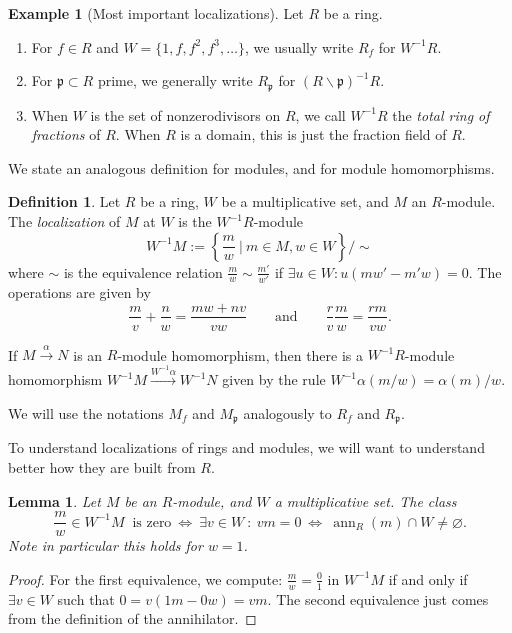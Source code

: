 \documentclass{amsart}[12pt]
\def\ann{\operatorname{ann}}
\newcommand{\p}{{\mathfrak p}}
\numberwithin{equation}{section}
\theoremstyle{plain} %
\newtheorem{lemma}[equation]{Lemma}
\theoremstyle{definition}
\newtheorem{definition}[equation]{Definition}
\newtheorem{example}[equation]{Example}
\theoremstyle{remark}
\begin{document}
\begin{example}[Most important localizations] Let $R$ be a ring.
	\begin{enumerate}
		\item For $f\in R$ and $W=\{1, f, f^2, f^3, \dots\}$, we usually write $R_f$ for $W^{-1}R$.
		\item For $\p\subset R$ prime, we generally write $R_{\p}$\index{$R_{\p}$} for $(R\smallsetminus \p)^{-1} R$.
		\item When $W$ is the set of nonzerodivisors on $R$, we call $W^{-1}R$ the \emph{total ring of fractions} of $R$. When $R$ is a domain, this is just the fraction field of $R$.
	\end{enumerate}
\end{example}

We state an analogous definition for modules, and for module homomorphisms.

\begin{definition}
	Let $R$ be a ring, $W$ be a multiplicative set, and $M$ an $R$-module. The \emph{localization} of $M$ at $W$ is the $W^{-1}R$-module
	\[ W^{-1} M := \left\{ \frac{m} {w} \ \Big| \ m\in M, w\in W \right\} / \sim \]
	where $\sim$ is the equivalence relation $\displaystyle \frac{m}{w}\sim \frac{m'}{w'}$ if $\exists u\in W : u(mw'-m'w)=0$. The operations are given by \[\frac{m}{v}+\frac{n}{w}=\frac{mw+nv}{vw} \qquad \text{and} \qquad \frac{r}{v} \frac{m}{w}=\frac{rm}{vw}.\]
	
	If $M\xrightarrow{\alpha} N$ is an $R$-module homomorphism, then there is a $W^{-1}R$-module homomorphism $W^{-1}M \xrightarrow{W^{-1}\alpha} W^{-1}N$ given by the rule $W^{-1}\alpha (m/w) = \alpha(m)/w$.
\end{definition}

We will use the notations $M_f$ and $M_{\p}$\index{$M_{\p}$} analogously to $R_f$ and $R_{\p}$.

To understand localizations of rings and modules, we will want to understand better how they are built from $R$.



\begin{lemma}
	Let $M$ be an $R$-module, and $W$ a multiplicative set. The class 
	\[ \frac{m}{w}\in W^{-1}M \ \text{ is zero} \ \iff \  \exists v\in W \ : \ vm=0   \ \iff \ \ann_R(m) \cap W \neq \varnothing.\]
	Note in particular this holds for $w=1$.
\end{lemma}
\begin{proof}
	For the first equivalence, we compute: $\frac{m}{w}=\frac{0}{1}$ in $W^{-1}M$ if and only if $\exists v\in W$ such that $0=v(1m-0w)=vm$. The second equivalence just comes from the definition of the annihilator.
\end{proof}
\end{document}
